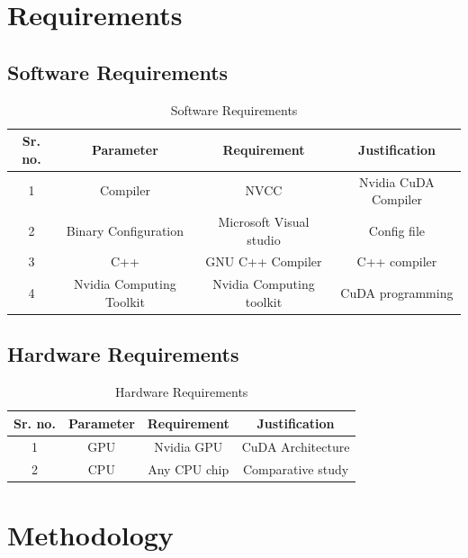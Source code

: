 \documentclass[12pt, letterpaper]{article}
\begin{document}
\newpage
\section{Requirements}
\subsection{Software Requirements}

\begin{table}[!htb]
\begin{center}
		\begin{tabular}{| c | c | c | c |}
		\hline		
		\textbf{Sr. no.} & \textbf{Parameter} & \textbf{Requirement} & \textbf{Justification}\\
		\hline		
		1 & Compiler & NVCC & Nvidia CuDA Compiler \\
		\hline
		2 & Binary Configuration & Microsoft Visual studio & Config file\\
		\hline
		3 & C++ & GNU C++ Compiler & C++ compiler\\
		\hline 
		4 & Nvidia Computing Toolkit & Nvidia Computing toolkit & CuDA programming\\
		\hline
		\end{tabular}
		\caption{Software Requirements}
\end{center}
\end{table}

\subsection{Hardware Requirements}

\begin{table}[!htb]
\begin{center}
		\begin{tabular}{| c | c | c | c |}
		\hline		
		\textbf{Sr. no.} & \textbf{Parameter} & \textbf{Requirement} & \textbf{Justification}\\
		\hline		
		1 & GPU & Nvidia GPU & CuDA Architecture \\
		\hline
		2 & CPU & Any CPU chip & Comparative study\\
		\hline
		\end{tabular}
		\caption{Hardware Requirements}
\end{center}
\end{table}

\newpage
\section{Methodology}
\end{document}
